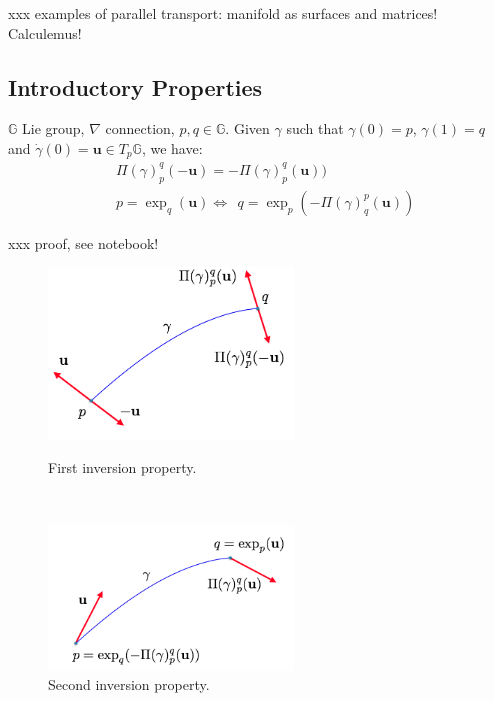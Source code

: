 \noindent
xxx examples of parallel transport: manifold as surfaces and matrices! Calculemus!

\subsection{Introductory Properties}

\begin{prop}[Inversion]
	$\mathbb{G}$ Lie group, $\nabla$ connection, $p,q\in\mathbb{G}$. Given $\gamma$ such that $\gamma(0)= p$, $\gamma(1)=q$ and $\dot{\gamma}(0)=\mathbf{u}\in T_{p}\mathbb{G}$, we have:
	\begin{align}
	& \Pi(\gamma)_{p}^{q}(-\mathbf{u}) = -\Pi(\gamma)_{p}^{q}(\mathbf{u}) )\\
	& p = \exp_{q}(\mathbf{u}) \Longleftrightarrow \phantom{z} q = \exp_{p}(-\Pi(\gamma)_{q}^{p}(\mathbf{u}))
	\end{align}
\end{prop}

\noindent
xxx proof, see notebook!


\begin{figure}[htbp]
	\centering
	\begin{minipage}[b]{3cm}
		\hspace{-4cm}
		\centering
		\includegraphics[width=6.5cm]{figures/inversion_1.png}
		\caption{First inversion property.}
		\label{fig:inversion_propr1}
	\end{minipage}
	\ \hspace{9mm} \
	\begin{minipage}[b]{4cm}
		\centering
		\includegraphics[width=6.5cm]{figures/inversion_2.png}
		\caption{Second inversion property.}
		\label{fig:inversion_propr2}
	\end{minipage}
\end{figure}



